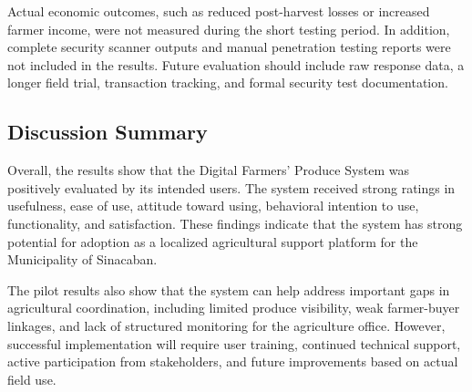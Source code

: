 Actual economic outcomes, such as reduced post-harvest losses or increased farmer income, were not measured during the short testing period. In addition, complete security scanner outputs and manual penetration testing reports were not included in the results. Future evaluation should include raw response data, a longer field trial, transaction tracking, and formal security test documentation.

\subsection{Discussion Summary}

Overall, the results show that the Digital Farmers' Produce System was positively evaluated by its intended users. The system received strong ratings in usefulness, ease of use, attitude toward using, behavioral intention to use, functionality, and satisfaction. These findings indicate that the system has strong potential for adoption as a localized agricultural support platform for the Municipality of Sinacaban.

The pilot results also show that the system can help address important gaps in agricultural coordination, including limited produce visibility, weak farmer-buyer linkages, and lack of structured monitoring for the agriculture office. However, successful implementation will require user training, continued technical support, active participation from stakeholders, and future improvements based on actual field use.
